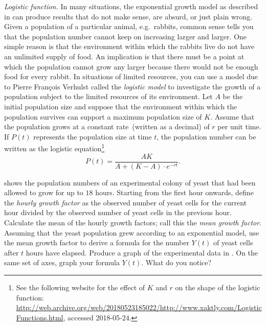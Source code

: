 \documentclass[a4paper,oneside,12pt]{article}
\begin{document}
\begin{problem}
\begin{table}[!htbp]
\centering

\caption{%
  The observed population size in an experimental colony of yeast.
  The data are due to T.~Carlson, published in~1913.  The ``Hour''
  column lists the number of hours that the population had been
  allowed to grow.  The ``Observed'' column lists the count of the
  number of yeast cells that were found in the colony after a given
  number of hours.
}
\label{tab:yeast}
\end{table}

\item\emph{Logistic function.}
  In many situations, the exponential growth model as described
  in  can produce results that do not
  make sense, are absurd, or just plain wrong.  Given a population of
  a particular animal, e.g.~rabbits, common sense tells you that the
  population number cannot keep on increasing larger and larger.  One
  simple reason is that the environment within which the rabbits live
  do not have an unlimited supply of food.  An implication is that
  there must be a point at which the population cannot grow any larger
  because there would not be enough food for every rabbit.  In
  situations of limited resources, you can use a model due to Pierre
  Fran\c{c}ois Verhulst called the \emph{logistic model} to
  investigate the growth of a population subject to the limited
  resources of its environment.  Let $A$ be the initial population
  size and suppose that the environment within which the population
  survives can support a maximum population size of $K$.  Assume that
  the population grows at a constant rate~(written as a decimal) of
  $r$ per unit time.  If $P(t)$ represents the population size at time
  $t$, the population number can be written as the logistic
  equation\footnote{
    See the following website for the effect of $K$ and $r$ on the
    shape of the logistic function:
    \url{http://web.archive.org/web/20180523185022/http://www.xaktly.com/LogisticFunctions.html},
    accessed 2018-05-24.
  }
  \begin{equation}
  \label{eqn:logistic_equation}
  P(t)
  =
  \frac{
    AK
  }{
    A + (K - A) \cdot e^{-rt}
  }.
  \end{equation}
  \begin{packedenum}
  \item\label{subprob:yeast_data_mean_growth_factor}
     shows the population numbers of an experimental
    colony of yeast that had been allowed to grow for up to $18$
    hours.  Starting from the first hour onwards, define the
    \emph{hourly growth factor} as the observed number of yeast cells
    for the current hour divided by the observed number of yeast cells
    in the previous hour.  Calculate the mean of the hourly growth
    factors; call this the \emph{mean growth factor}.  Assuming that
    the yeast population grew according to an exponential model, use
    the mean growth factor to derive a formula for the number $Y(t)$
    of yeast cells after $t$ hours have elapsed.  Produce a graph of
    the experimental data in .  On the same set of
    axes, graph your formula $Y(t)$.  What do you notice?


\end{packedenum}
\end{problem}
\end{document}
